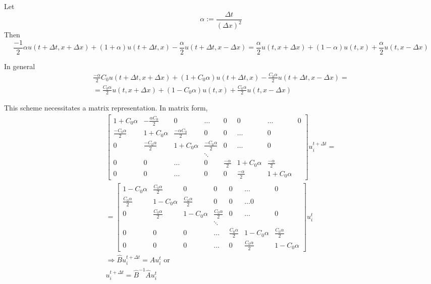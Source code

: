 \documentclass[10pt]{amsart}
\begin{document}
\begin{multicols*}{2}
  Let
\[
  \alpha := \frac{ \Delta t}{ (\Delta x)^2 }
  \]
Then
\begin{equation}
  \frac{-1}{2} \alpha u(t+\Delta t, x+\Delta x) + (1+\alpha) u(t+\Delta t,x) - \frac{\alpha}{2} u(t+\Delta t, x-\Delta x) = \frac{ \alpha}{2}u(t,x+\Delta x) + (1-\alpha)u(t,x) + \frac{\alpha}{2}u(t,x-\Delta x)
\end{equation}
  
In general
\begin{equation}
\begin{gathered}
  \frac{-\alpha}{2} C_0 u(t+\Delta t,x+\Delta x) + (1 + C_0 \alpha)u(t+\Delta t,x) - \frac{ C_0 \alpha}{2} u(t+\Delta t, x-\Delta x) = \\
  = \frac{ C_0 \alpha}{2} u(t,x+\Delta x) + (1- C_0 \alpha)u(t,x) + \frac{C_0\alpha}{2}u(t,x-\Delta x)
  \end{gathered}
  \end{equation}

This scheme necessitates a matrix representation.  In matrix form,
\begin{equation}
  \begin{gathered}
    \left[ \begin{matrix}
        1 + C_0 \alpha & - \frac{ \alpha C_0}{2} & 0 & \dots & 0 & 0 & \dots & 0 \\
        \frac{ -C_0\alpha}{2} & 1 + C_0 \alpha & \frac{ -\alpha C_0 }{2} & 0 & 0 & \dots & 0 \\
        0 & \frac{ -C_0 \alpha}{2} & 1 +C_0\alpha & \frac{ -C_0 \alpha}{2} & 0 & \dots & 0 \\
         &                         &              & \ddots &                   &      &   \\
        0 & 0 & \dots & 0 & \frac{-\alpha}{2} & 1 + C_0 \alpha & \frac{-\alpha}{2} \\
        0 & 0 & \dots & 0 & 0                 & \frac{ -\alpha}{2} & 1 + C_0 \alpha \end{matrix} \right] u_i^{t+\Delta t} = \\
    = \left[ \begin{matrix}
        1 - C_0 \alpha & \frac{C_0 \alpha }{2} & 0 & 0 & 0 & \dots & 0 \\
        \frac{C_0 \alpha}{2} & 1 - C_0 \alpha & \frac{C_0 \alpha}{2} & 0 & 0 & \dots 0 \\
        0 & \frac{C_0 \alpha}{2} & 1 - C_0\alpha & \frac{C_0 \alpha}{2} & 0 & \dots & 0 \\
        &                       &               & \ddots             &    &      & \\
        0 & 0 & 0                        & \dots & \frac{C_0 \alpha}{2} & 1 - C_0 \alpha & \frac{C_0 \alpha}{2} \\
        0 & 0 & 0 &                \dots &  0  & \frac{C_0 \alpha}{2} & 1 - C_0 \alpha \end{matrix} \right]  u_i^t  \\
    \Longrightarrow \widehat{B} u_i^{t+ \Delta t } = \widehat{A} u_i^{t} \text{ or } \\
    u_i^{t+\Delta t} = \widehat{B}^{-1}\widehat{A}u_i^t
\end{gathered}
\end{equation}


\end{multicols*}
\end{document}
